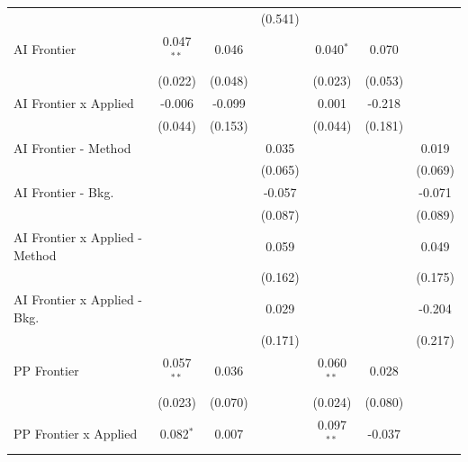 \begin{tabular}{lcccccc}
                                  &                &                & (0.541)      &                &               &   \\   
   AI Frontier                    & 0.047$^{**}$   & 0.046          &              & 0.040$^{*}$    & 0.070         &   \\   
                                  & (0.022)        & (0.048)        &              & (0.023)        & (0.053)       &   \\   
   AI Frontier x Applied          & -0.006         & -0.099         &              & 0.001          & -0.218        &   \\   
                                  & (0.044)        & (0.153)        &              & (0.044)        & (0.181)       &   \\   
   AI Frontier - Method           &                &                & 0.035        &                &               & 0.019\\   
                                  &                &                & (0.065)      &                &               & (0.069)\\   
   AI Frontier - Bkg.             &                &                & -0.057       &                &               & -0.071\\   
                                  &                &                & (0.087)      &                &               & (0.089)\\   
   AI Frontier x Applied - Method &                &                & 0.059        &                &               & 0.049\\   
                                  &                &                & (0.162)      &                &               & (0.175)\\   
   AI Frontier x Applied - Bkg.   &                &                & 0.029        &                &               & -0.204\\   
                                  &                &                & (0.171)      &                &               & (0.217)\\   
   PP Frontier                    & 0.057$^{**}$   & 0.036          &              & 0.060$^{**}$   & 0.028         &   \\   
                                  & (0.023)        & (0.070)        &              & (0.024)        & (0.080)       &   \\   
   PP Frontier x Applied          & 0.082$^{*}$    & 0.007          &              & 0.097$^{**}$   & -0.037        &   \\   

\end{tabular}
